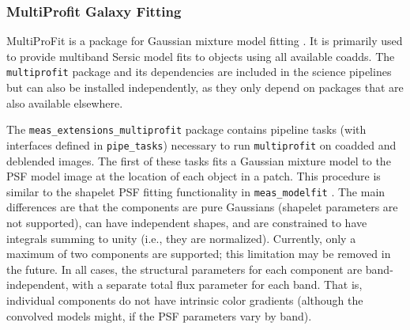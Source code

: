 \subsubsection{MultiProfit Galaxy Fitting}
\label{sec:multiprofit}

MultiProFit is a package for Gaussian mixture model fitting \citep{DMTN-312}.
It is primarily used to provide multiband Sersic model fits to objects using all available coadds.
The \texttt{multiprofit} package and its dependencies are included in the science pipelines but can also be installed independently, as they only depend on packages that are also available elsewhere.

The \texttt{meas\_extensions\_multiprofit} package contains pipeline tasks (with interfaces defined in \texttt{pipe\_tasks}) necessary to run \texttt{multiprofit} on coadded and deblended images.
The first of these tasks fits a Gaussian mixture model to the PSF model image at the location of each object in a patch.
This procedure is similar to the shapelet PSF fitting functionality in \texttt{meas\_modelfit} .
The main differences are that the components are pure Gaussians (shapelet parameters are not supported), can have independent shapes, and are constrained to have integrals summing to unity (i.e., they are normalized).
Currently, only a maximum of two components are supported; this limitation may be removed in the future.
In all cases, the structural parameters for each component are band-independent, with a separate total flux parameter for each band.
That is, individual components do not have intrinsic color gradients (although the convolved models might, if the PSF parameters vary by band).
